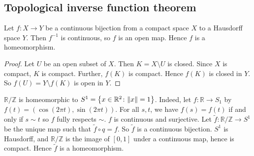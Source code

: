 \subsection{Topological inverse function theorem}
\begin{theorem}
	Let \( f \colon X \to Y \) be a continuous bijection from a compact space \( X \) to a Hausdorff space \( Y \).
	Then \( f^{-1} \) is continuous, so \( f \) is an open map.
	Hence \( f \) is a homeomorphism.
\end{theorem}
\begin{proof}
	Let \( U \) be an open subset of \( X \).
	Then \( K = X \setminus U \) is closed.
	Since \( X \) is compact, \( K \) is compact.
	Further, \( f(K) \) is compact.
	Hence \( f(K) \) is closed in \( Y \).
	So \( f(U) = Y \setminus f(K) \) is open in \( Y \).
\end{proof}
\begin{example}
	\( \mathbb R / \mathbb Z \) is homeomorphic to \( S^1 = \qty{ x \in \mathbb R^2 \colon \norm{x} = 1 } \).
	Indeed, let \( f \colon \mathbb R \to S_1 \) by \( f(t) = (\cos(2\pi t), \sin(2 \pi t)) \).
	For all \( s,t \), we have \( f(s) = f(t) \) if and only if \( s \sim t \) so \( f \) fully respects \( \sim \).
	\( f \) is continuous and surjective.
	Let \( \widetilde f \colon \mathbb R / \mathbb Z \to S^1 \) be the unique map such that \( \widetilde f \circ q = f \).
	So \( \widetilde f \) is a continuous bijection.
	\( S^1 \) is Hausdorff, and \( \mathbb R / \mathbb Z \) is the image of \( [0,1] \) under a continuous map, hence is compact.
	Hence \( \widetilde f \) is a homeomorphism.
\end{example}

